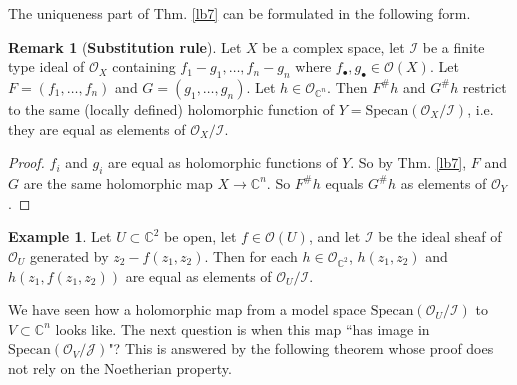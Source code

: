 \documentclass[12pt,b5paper,notitlepage]{report}
\theoremstyle{definition}
\newtheorem{eg}[df]{Example}
\newtheorem{rem}[df]{Remark}
\theoremstyle{plain}
\newcommand{\mc}{\mathcal}
\newcommand{\scr}{\mathscr}
\newcommand{\blt}{\bullet}
\newcommand{\Cbb}{\mathbb C}
\newcommand{\Specan}{\mathrm{Specan}}
\numberwithin{equation}{section}
\begin{document}
The uniqueness part of Thm. \ref{lb7} can be formulated in the following form.
\begin{rem}[\textbf{Substitution rule}]\label{lb27}
Let $X$ be a complex space, let $\mc I$ be a finite type ideal of $\scr O_X$ containing $f_1-g_1,\dots,f_n-g_n$ where $f_\blt,g_\blt\in\scr O(X)$. Let $F=(f_1,\dots,f_n)$ and $G=(g_1,\dots,g_n)$. Let $h\in\scr O_{\Cbb^n}$. Then $F^\#h$ and $G^\#h$ restrict to the same (locally defined) holomorphic function of $Y=\Specan(\scr O_X/\mc I)$, i.e. they are equal as elements of $\scr O_X/\mc I$.
\end{rem}
\begin{proof}
$f_i$ and $g_i$ are equal as holomorphic functions of $Y$. So by Thm. \ref{lb7}, $F$ and $G$ are the same holomorphic map $X\rightarrow\Cbb^n$. So $F^\#h$ equals $G^\#h$ as elements of $\scr O_Y$.
\end{proof}

\begin{eg}
Let $U\subset\Cbb^2$ be open, let $f\in\scr O(U)$, and let $\mc I$ be the ideal sheaf of $\scr O_U$ generated by $z_2-f(z_1,z_2)$. Then for each $h\in\scr O_{\Cbb^2}$, $h(z_1,z_2)$ and $h(z_1,f(z_1,z_2))$ are equal as elements of $\scr O_U/\mc I$. %
\end{eg}




We have seen how a holomorphic map from a model space $\Specan(\scr O_U/\mc I)$ to $V\subset\Cbb^n$ looks like. The next question is when this map ``has image in $\Specan(\scr O_V/\mc J)$"? This is answered by the following theorem whose proof does not rely on the Noetherian property.
\end{document}
